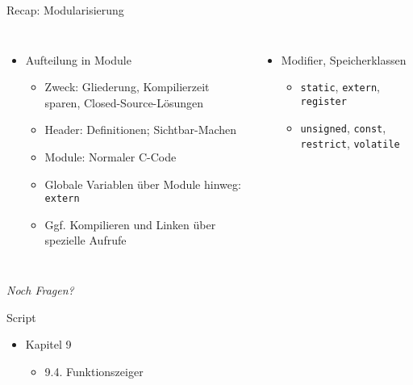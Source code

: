\begin{frame}{Recap: Modularisierung}
%
\begin{columns}[T]
\begin{itemize}
\item Aufteilung in Module
	\begin{itemize}
	\item Zweck: Gliederung, Kompilierzeit sparen, Closed-Source-Lösungen
	\item Header: Definitionen; Sichtbar-Machen
	\item Module: Normaler C-Code
	\item Globale Variablen über Module hinweg: \texttt{extern}
	\item Ggf. Kompilieren und Linken über spezielle Aufrufe
	\end{itemize}
\end{itemize}
%
\begin{itemize}
\item Modifier, Speicherklassen
	\begin{itemize}
	\item \texttt{static}, \texttt{extern}, \texttt{register}
	\item \texttt{unsigned}, \texttt{const}, \texttt{restrict}, 
		\texttt{volatile}
	\end{itemize}
\end{itemize}
\end{columns}
%
\begin{center}
\emph{Noch Fragen?}
\end{center}
%
\end{frame}


\begin{frame}{Script}
%
\begin{itemize}
\item Kapitel 9
	\begin{itemize}
	\item 9.4. Funktionszeiger
	\end{itemize}
\end{itemize}
%
\end{frame}


